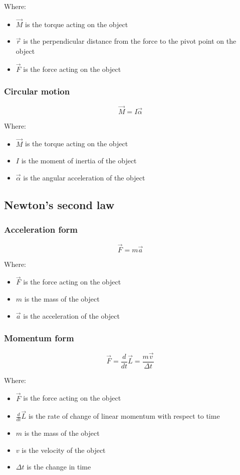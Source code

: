 \documentclass[11pt]{article}
\begin{document}
Where:
\begin{itemize}
\item \(\vec{M}\) is the torque acting on the object
\item \(\vec{r}\) is the perpendicular distance from the force to the pivot point on the object
\item \(\vec{F}\) is the force acting on the object
\end{itemize}

\subsubsection{Circular motion}
\label{sec:org12ff135}
\[\vec{M} = I \vec{\alpha}\]

Where:
\begin{itemize}
\item \(\vec{M}\) is the torque acting on the object
\item \(I\) is the moment of inertia of the object
\item \(\vec{\alpha}\) is the angular acceleration of the object
\end{itemize}

\subsection{Newton's second law}
\label{sec:orgca20c14}

\subsubsection{Acceleration form}
\label{sec:org74cf501}
\[\vec{F} = m \vec{a}\]

Where:
\begin{itemize}
\item \(\vec{F}\) is the force acting on the object
\item \(m\) is the mass of the object
\item \(\vec{a}\) is the acceleration of the object
\end{itemize}

 \newpage

\subsubsection{Momentum form}
\label{sec:org812f2c4}
\[\vec{F} = \frac{d}{dt} \vec{L} = \frac{m \vec{v}}{\Delta t}\]

Where:
\begin{itemize}
\item \(\vec{F}\) is the force acting on the object
\item \(\frac{d}{dt} \vec{L}\) is the rate of change of linear momentum with respect to time
\item \(m\) is the mass of the object
\item \(v\) is the velocity of the object
\item \(\Delta t\) is the change in time
\end{itemize}
\end{document}
